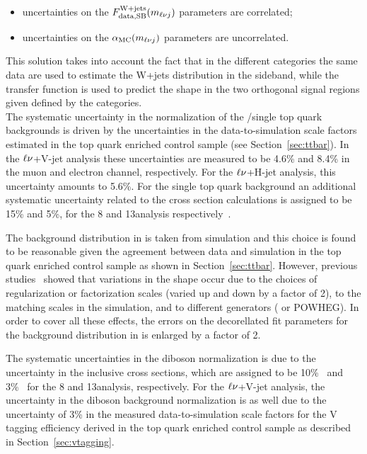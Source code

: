 \begin{itemize}
\item uncertainties on the $F_\mathrm{data, SB}^{\mathrm{W+jets}}(m_{\ell\nu j})$ parameters are correlated;
\item uncertainties on the $\alpha_\mathrm{MC}(m_{\ell\nu j})$ parameters are uncorrelated.
\end{itemize}

This solution takes into account the fact that in the different \mJ categories the same data are used to estimate the W+jets \mlvj distribution in the sideband, while the transfer function is used to predict the shape in the two orthogonal signal regions given defined by the categories.\\

The systematic uncertainty in the normalization of the \ttbar/single top quark backgrounds is driven by the uncertainties in the data-to-simulation scale factors estimated in the top quark enriched control sample (see Section~\ref{sec:ttbar}). In the $\ell\nu$+V-jet analysis these uncertainties are measured to be 4.6\% and 8.4\% in the muon and electron channel, respectively. For the $\ell\nu$+H-jet analysis, this uncertainty amounts to 5.6\%.
For the single top quark background an additional systematic uncertainty related to the cross section calculations is assigned to be 15\% and 5\%, for the 8 and 13\TeV analysis respectively~\cite{Chatrchyan:2012ep,Kant:2014oha}.

The \ttbar background distribution in \mlvj is taken from simulation and this choice is found to be reasonable given the
agreement between data and simulation in the top quark enriched control sample as shown in Section~\ref{sec:ttbar}.
However, previous studies~\cite{Khachatryan:2014gha} showed that variations in the shape occur due to the choices of regularization or factorization scales (varied up and down by a factor of 2),
to the matching scales in the \MADGRAPH{} simulation, and to different generators (\MADGRAPH{} or \textsc{POWHEG}).
In order to cover all these effects, the errors on the decorellated fit parameters for the \ttbar background distribution in \mlvj is enlarged by a factor of 2.

The systematic uncertainties in the diboson normalization is due to the uncertainty in the inclusive cross sections, which are assigned to be 10\%~\cite{Chatrchyan:2013oev} and 3\%~\cite{Gehrmann:2014fva} for the 8 and 13\TeV analysis, respectively.
For the $\ell\nu$+V-jet analysis, the uncertainty in the diboson background normalization is as well due to the uncertainty of 3\% in the measured data-to-simulation scale factors for the V tagging efficiency derived in the top quark enriched control sample as described in Section~\ref{sec:vtagging}.

